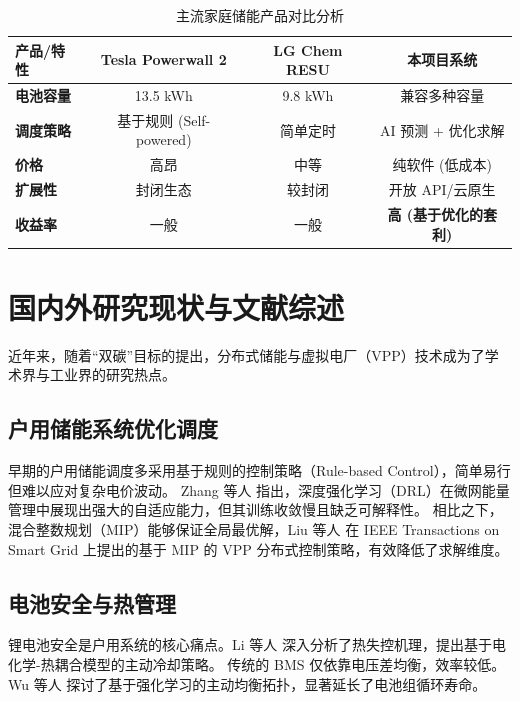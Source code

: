 \begin{table}[htbp]
    \centering
    \caption{主流家庭储能产品对比分析}
    \label{tab:competitors}
    \begin{tabular}{|l|c|c|c|}
        \hline
        \textbf{产品/特性} & \textbf{Tesla Powerwall 2} & \textbf{LG Chem RESU} & \textbf{本项目系统}       \\ \hline
        \textbf{电池容量}  & 13.5 kWh                   & 9.8 kWh               & 兼容多种容量               \\ \hline
        \textbf{调度策略}  & 基于规则 (Self-powered)        & 简单定时                  & AI 预测 + 优化求解         \\ \hline
        \textbf{价格}    & 高昂                         & 中等                    & 纯软件 (低成本)            \\ \hline
        \textbf{扩展性}   & 封闭生态                       & 较封闭                   & 开放 API/云原生           \\ \hline
        \textbf{收益率}   & 一般                         & 一般                    & \textbf{高 (基于优化的套利)} \\ \hline
    \end{tabular}
\end{table}

\section{国内外研究现状与文献综述}
近年来，随着“双碳”目标的提出，分布式储能与虚拟电厂（VPP）技术成为了学术界与工业界的研究热点。

\subsection{户用储能系统优化调度}
早期的户用储能调度多采用基于规则的控制策略（Rule-based Control），简单易行但难以应对复杂电价波动。
Zhang 等人 \cite{zhang2023review} 指出，深度强化学习（DRL）在微网能量管理中展现出强大的自适应能力，但其训练收敛慢且缺乏可解释性。
相比之下，混合整数规划（MIP）能够保证全局最优解，Liu 等人 \cite{liu2022distributed} 在 IEEE Transactions on Smart Grid 上提出的基于 MIP 的 VPP 分布式控制策略，有效降低了求解维度。

\subsection{电池安全与热管理}
锂电池安全是户用系统的核心痛点。Li 等人 \cite{li2023thermal} 深入分析了热失控机理，提出基于电化学-热耦合模型的主动冷却策略。
传统的 BMS 仅依靠电压差均衡，效率较低。Wu 等人 \cite{wu2024reinforcement} 探讨了基于强化学习的主动均衡拓扑，显著延长了电池组循环寿命。

